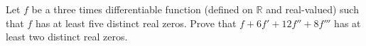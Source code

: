 Let $f$ be a three times differentiable function (defined on $\mathbb{R}$ and real-valued) such that $f$ has at least five distinct real zeros. Prove that $f + 6f' + 12f'' + 8f'''$ has at least two distinct real zeros.
